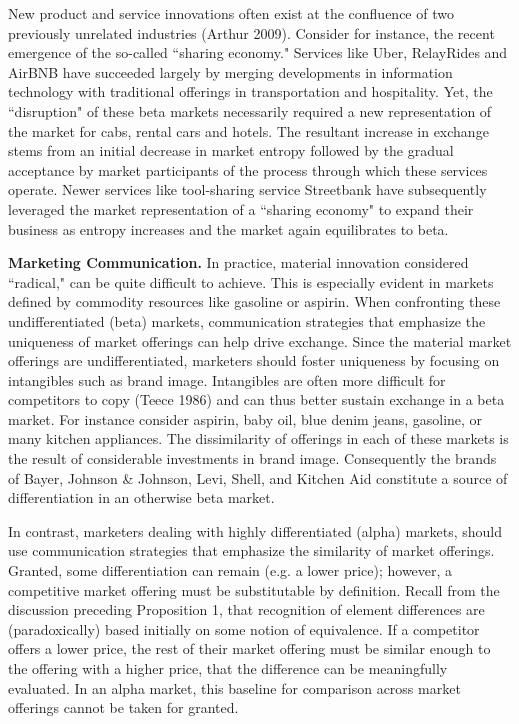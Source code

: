 New product and service innovations often exist at the confluence of two previously unrelated industries (Arthur 2009). Consider for instance, the recent emergence of the so-called ``sharing economy." Services like Uber, RelayRides and AirBNB  have succeeded largely by merging developments in information technology with traditional offerings in transportation and hospitality. Yet, the ``disruption" of these beta markets necessarily required a new representation of the market for cabs, rental cars and hotels. The resultant increase in exchange stems from an initial decrease in market entropy followed by the gradual acceptance by market participants of the process through which these services operate. Newer services like tool-sharing service Streetbank have subsequently leveraged the market representation of a ``sharing economy" to expand their business as entropy increases and the market again equilibrates to beta. 

\textbf{Marketing Communication.}
In practice, material innovation considered ``radical," can be quite difficult to achieve. This is especially evident in markets defined by commodity resources like gasoline or aspirin.  When confronting these undifferentiated (beta) markets, communication strategies that emphasize the uniqueness of market offerings can help drive exchange. Since the material market offerings are undifferentiated, marketers should foster uniqueness by focusing on intangibles such as brand image. Intangibles are often more difficult for competitors to copy (Teece 1986) and can thus better sustain exchange in a beta market. For instance consider aspirin, baby oil, blue denim jeans, gasoline, or many kitchen appliances. The dissimilarity of offerings in each of these markets is the result of considerable investments in brand image. Consequently the brands of Bayer, Johnson \& Johnson, Levi, Shell, and Kitchen Aid constitute a source of differentiation in an otherwise beta market. 

In contrast, marketers dealing with highly differentiated (alpha) markets, should use communication strategies that emphasize the similarity of market offerings. Granted, some differentiation can remain (e.g. a lower price); however, a competitive market offering must be substitutable by definition. Recall from the discussion preceding Proposition 1, that recognition of element differences are (paradoxically) based initially on some notion of equivalence. If a competitor offers a lower price, the rest of their market offering must be similar enough to the offering with a higher price, that the difference can be meaningfully evaluated. In an alpha market, this baseline for comparison across market offerings cannot be taken for granted.

